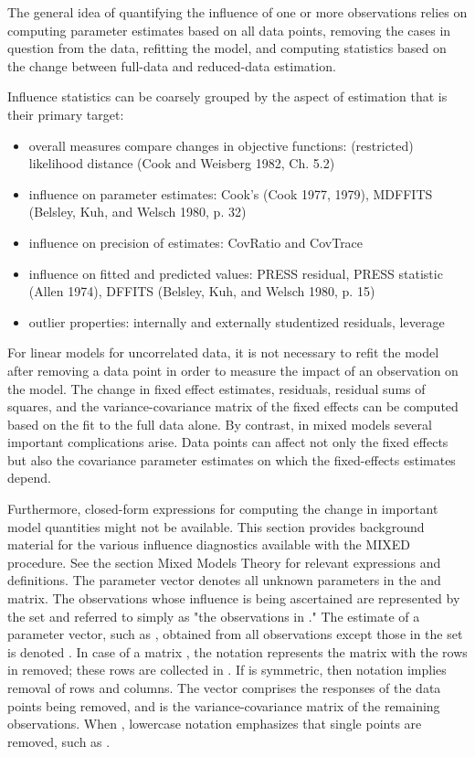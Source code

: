 \documentclass[12pt, a4paper]{article}
\begin{document}
The general idea of quantifying the influence of one or more observations relies on computing parameter estimates based on all data points, removing the cases in question from the data, refitting the model, and computing statistics based on the change between full-data and reduced-data estimation. 

Influence statistics can be coarsely grouped by the aspect of estimation that is their primary target:
\begin{itemize}
	\item overall measures compare changes in objective functions: (restricted) likelihood distance (Cook and Weisberg 1982, Ch. 5.2)
	\item influence on parameter estimates: Cook’s  (Cook 1977, 1979), MDFFITS (Belsley, Kuh, and Welsch 1980, p. 32)
	\item influence on precision of estimates: CovRatio and CovTrace
	\item influence on fitted and predicted values: PRESS residual, PRESS statistic (Allen 1974), DFFITS (Belsley, Kuh, and Welsch 1980, p. 15)
	\item outlier properties: internally and externally studentized residuals, leverage
\end{itemize}
For linear models for uncorrelated data, it is not necessary to refit the model after removing a data point in order to measure the impact of an observation on the model. The change in fixed effect estimates, residuals, residual sums of squares, and the variance-covariance matrix of the fixed effects can be computed based on the fit to the full data alone. By contrast, in mixed models several important complications arise. Data points can affect not only the fixed effects but also the covariance parameter estimates on which the fixed-effects estimates depend. 

Furthermore, closed-form expressions for computing the change in important model quantities might not be available.
This section provides background material for the various influence diagnostics available with the MIXED procedure. See the section Mixed Models Theory for relevant expressions and definitions. The parameter vector  denotes all unknown parameters in the  and  matrix.
The observations whose influence is being ascertained are represented by the set  and referred to simply as "the observations in ." The estimate of a parameter vector, such as , obtained from all observations except those in the set  is denoted . In case of a matrix , the notation  represents the matrix with the rows in  removed; these rows are collected in . If  is symmetric, then notation  implies removal of rows and columns. The vector  comprises the responses of the data points being removed, and  is the variance-covariance matrix of the remaining observations. When , lowercase notation emphasizes that single points are removed, such as .
\end{document}
